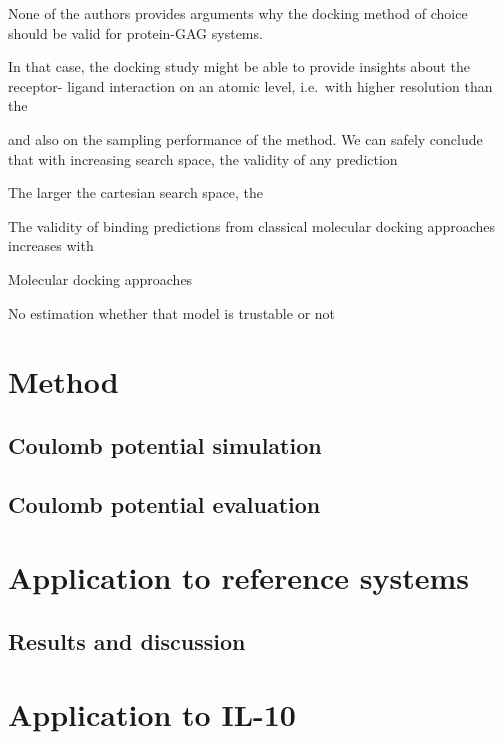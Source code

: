 None of the authors provides arguments why the docking method of choice should
be valid for protein-GAG systems.



 In that case,
the docking study might be able to provide insights about the receptor- ligand
interaction on an atomic level, i.e.\ with higher resolution than the



 and
also on the sampling performance of the method. We can safely conclude that with
increasing search space, the validity of any prediction

The larger the cartesian search space, the

The validity of binding predictions from classical molecular docking approaches
increases with

Molecular docking approaches

No estimation whether that model is trustable or not

\section{Method}

\subsection{Coulomb potential simulation}

\subsection{Coulomb potential evaluation}

\section{Application to reference systems}

\subsection{Results and discussion}

\section{Application to IL-10}





